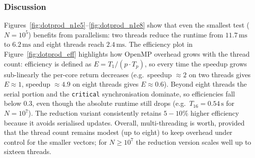 \subsubsection{Discussion}
Figures~\ref{fig:dotprod_n1e5}--\ref{fig:dotprod_n1e8} show that even the smallest test ($N = 10^5$) benefits from parallelism: two threads reduce the runtime from $11.7\,\mathrm{ms}$ to $6.2\,\mathrm{ms}$ and eight threads reach $2.4\,\mathrm{ms}$. The efficiency plot in Figure~\ref{fig:dotprod_eff} highlights how OpenMP overhead grows with the thread count: efficiency is defined as $E = T_1 /(p \cdot T_p)$, so every time the speedup grows sub-linearly the per-core return decreases (e.g.\ speedup $\approx 2$ on two threads gives $E \approx 1$, speedup $\approx 4.9$ on eight threads gives $E \approx 0.6$). Beyond eight threads the serial portion and the \texttt{critical} synchronisation dominate, so efficiencies fall below $0.3$, even though the absolute runtime still drops (e.g.\ $T_{16} = 0.54\,\mathrm{s}$ for $N = 10^7$). The reduction variant consistently retains $5{-}10\%$ higher efficiency because it avoids serialised updates. Overall, multi-threading is worth, provided that the thread count remains modest (up to eight) to keep overhead under control for the smaller vectors; for $N \ge 10^7$ the reduction version scales well up to sixteen threads.


